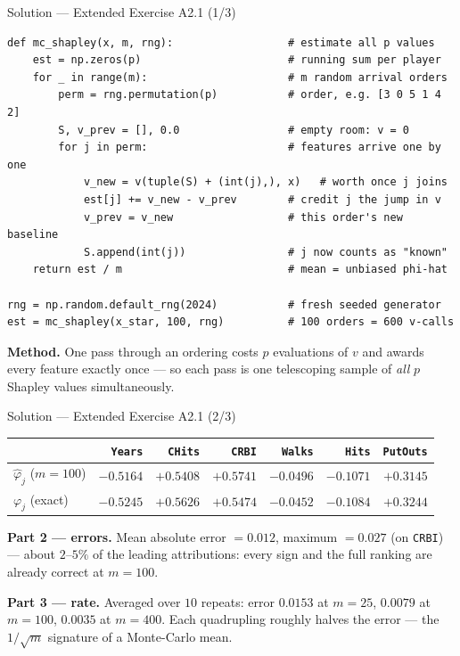 \documentclass[aspectratio=169,11pt]{beamer}
\begin{document}
\begin{frame}[fragile]{Solution --- Extended Exercise A2.1 (1/3)}
\begin{solutionbox}
  \begin{lstlisting}[basicstyle=\ttfamily\scriptsize]
def mc_shapley(x, m, rng):                  # estimate all p values
    est = np.zeros(p)                       # running sum per player
    for _ in range(m):                      # m random arrival orders
        perm = rng.permutation(p)           # order, e.g. [3 0 5 1 4 2]
        S, v_prev = [], 0.0                 # empty room: v = 0
        for j in perm:                      # features arrive one by one
            v_new = v(tuple(S) + (int(j),), x)   # worth once j joins
            est[j] += v_new - v_prev        # credit j the jump in v
            v_prev = v_new                  # this order's new baseline
            S.append(int(j))                # j now counts as "known"
    return est / m                          # mean = unbiased phi-hat

rng = np.random.default_rng(2024)           # fresh seeded generator
est = mc_shapley(x_star, 100, rng)          # 100 orders = 600 v-calls
  \end{lstlisting}
  \textbf{Method.} One pass through an ordering costs $p$ evaluations of $v$ and
  awards every feature exactly once --- so each pass is one telescoping sample of
  \emph{all} $p$ Shapley values simultaneously.
\end{solutionbox}
\end{frame}

\begin{frame}{Solution --- Extended Exercise A2.1 (2/3)}
\begin{solutionbox}[Solution --- the $m{=}100$ run against the exact values]
  \begin{center}
  \begin{tabular}{@{}lrrrrrr@{}}
    \toprule
    & \texttt{Years} & \texttt{CHits} & \texttt{CRBI} & \texttt{Walks} & \texttt{Hits} & \texttt{PutOuts} \\
    \midrule
    $\hat\varphi_j$ ($m{=}100$) & $-0.5164$ & $+0.5408$ & $+0.5741$ & $-0.0496$ & $-0.1071$ & $+0.3145$ \\
    $\varphi_j$ (exact)         & $-0.5245$ & $+0.5626$ & $+0.5474$ & $-0.0452$ & $-0.1084$ & $+0.3244$ \\
    \bottomrule
  \end{tabular}
  \end{center}
  \textbf{Part 2 --- errors.} Mean absolute error $= 0.012$, maximum $= 0.027$
  (on \texttt{CRBI}) --- about $2$--$5\%$ of the leading attributions: every sign
  and the full ranking are already correct at $m=100$.

  \medskip
  \textbf{Part 3 --- rate.} Averaged over $10$ repeats: error $0.0153$ at $m=25$,
  $0.0079$ at $m=100$, $0.0035$ at $m=400$. Each quadrupling roughly halves the
  error --- the $1/\sqrt{m}$ signature of a Monte-Carlo mean.
\end{solutionbox}
\end{frame}
\end{document}
